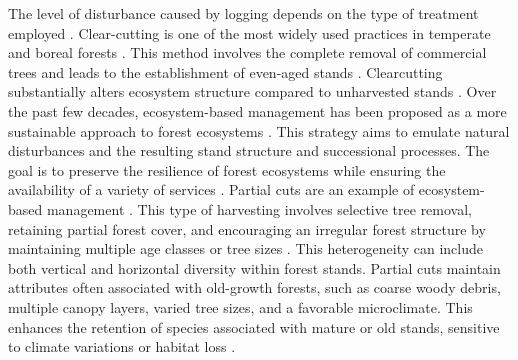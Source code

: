 The level of disturbance caused by logging depends on the type of treatment employed \citep{Harpole1999Effectsseven,Chaudhary2016Impactforest,Koivula2019Responsesboreal}. 
Clear-cutting is one of the most widely used practices in temperate and boreal forests \citep{Fedrowitz2014Canretention,Chaudhary2016Impactforest}. 
This method involves the complete removal of commercial trees and leads to the establishment of even-aged stands \citep{Brashears2004AssessmentCanopy,Martin2020Forestmanagement}. 
Clearcutting substantially alters ecosystem structure compared to unharvested stands \citep{Hanski2000Extinctiondebt}. 
Over the past few decades, ecosystem-based management has been proposed as a more sustainable approach to forest ecosystems \citep{Perry1998scientificbasis,Kuuluvainen2002Naturalvariabilitya}. 
This strategy aims to emulate natural disturbances and the resulting stand structure and successional processes. 
The goal is to preserve the resilience of forest ecosystems while ensuring the availability of a variety of services \citep{Szaro1998emergenceecosystem,MacDicken2015Globalprogress}. 
Partial cuts are an example of ecosystem-based management \citep{Bergeron1999Forestmanagementa,Raymond2009irregularshelterwood}. 
This type of harvesting involves selective tree removal, retaining partial forest cover, and encouraging an irregular forest structure by maintaining multiple age classes or tree sizes \citep{Raymond2009irregularshelterwood}. 
This heterogeneity can include both vertical and horizontal diversity within forest stands. 
Partial cuts maintain attributes often associated with old-growth forests, such as coarse woody debris, multiple canopy layers, varied tree sizes, and a favorable microclimate. 
This enhances the retention of species associated with mature or old stands, sensitive to climate variations or habitat loss \citep{Hansen1991Conservingbiodiversity,Ameray2021Forestcarbon}. 

